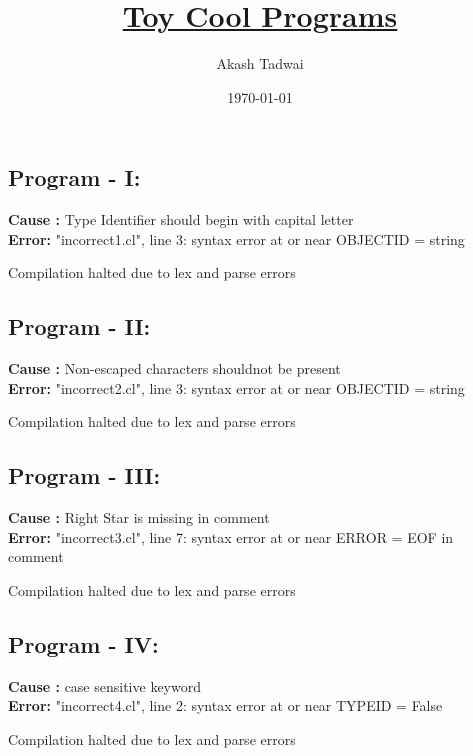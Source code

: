\documentclass[english,a4paper,12pt]{article}
\title{\textbf{\underline{\Huge{Toy Cool Programs}}}}
\author{Akash Tadwai}
\date{\today}
\begin{document}
\maketitle
\section*{}

\subsection*{\textbf{Program - I}:}
\textbf{Cause :} Type Identifier should begin with capital letter \\
\textbf{Error:} "incorrect1.cl", line 3: syntax error at or near OBJECTID = string


\qquad \hspace{1mm}Compilation halted due to lex and parse errors

\subsection*{\textbf{Program - II}:}
\textbf{Cause :} Non-escaped characters shouldnot be present \\
\textbf{Error:} "incorrect2.cl", line 3: syntax error at or near OBJECTID = string


\qquad \hspace{1mm}Compilation halted due to lex and parse errors

\subsection*{\textbf{Program - III}:}
\textbf{Cause :} Right Star is missing in comment \\
\textbf{Error:} "incorrect3.cl", line 7: syntax error at or near ERROR = EOF in comment


\qquad \hspace{1mm}Compilation halted due to lex and parse errors


\subsection*{\textbf{Program - IV}:}
\textbf{Cause :} case sensitive keyword \\
\textbf{Error:} "incorrect4.cl", line 2: syntax error at or near TYPEID = False


\qquad \hspace{1mm}Compilation halted due to lex and parse errors
\end{document}

